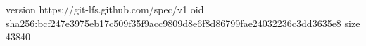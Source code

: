 version https://git-lfs.github.com/spec/v1
oid sha256:bcf247e3975eb17c509f35f9acc9809d8e6f8d86799fae24032236c3dd3635e8
size 43840

